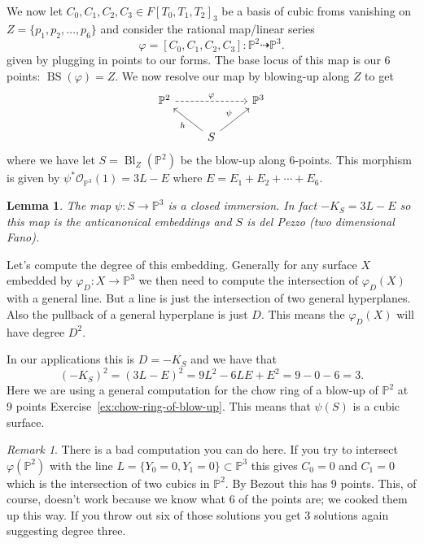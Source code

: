 \documentclass[12pt]{article}
\numberwithin{equation}{section}
\newtheorem{lemma}[theorem]{Lemma}
\theoremstyle{definition}
\theoremstyle{remark}
\newtheorem{remark}[theorem]{Remark}
\newcommand{\Ocal}{\mathcal{O}}
\newcommand{\PP}{\mathbb{P}}
\newcommand{\Bl}{\operatorname{Bl}}
\newcommand{\BS}{\operatorname{BS}}
\begin{document}
We now let $C_0,C_1,C_2,C_3 \in F[T_0,T_1,T_2]_3$ be a basis of cubic froms vanishing on $Z = \lbrace p_1,p_2,\ldots,p_6\rbrace$  and consider the rational map/linear series
$$ \varphi=[C_0,C_1,C_2,C_3]: \PP^2 \dashrightarrow \PP^3.$$
given by plugging in points to our  forms. 
The base locus of this map is our 6 points: $\BS(\varphi)=Z$.
We now resolve our map by blowing-up along $Z$ to get 
$$\begin{tikzcd}
\PP^2 \ar[rr,dashed,"\varphi"] & & \PP^3 \\
& S \ar[ur,"\psi"] \ar[ul,"h"] & 
\end{tikzcd}
$$
where we have let $S=\Bl_Z(\PP^2)$ be the blow-up along $6$-points.
This morphism is given by $\psi^*\Ocal_{\PP^3}(1) = 3L-E$ where $E=E_1+E_2+\cdots+E_6$.

\begin{lemma}
	The map $\psi:S \to \PP^3$ is a closed immersion. In fact $-K_S=3L-E$ so this map is the anticanonical embeddings and $S$ is del Pezzo (two dimensional Fano). 
\end{lemma}

Let's compute the degree of this embedding.
Generally for any surface $X$ embedded by $\varphi_D:X \to \PP^3$ we then need to compute the intersection of $\varphi_D(X)$ with a general line. 
But a line is just the intersection of two general hyperplanes. 
Also the pullback of a general hyperplane is just $D$. 
This means the $\varphi_D(X)$ will have degree $D^2$. 

In our applications this is $D=-K_S$ and we have that 
$$ (-K_S)^2 = (3L-E)^2 = 9L^2-6LE+E^2 = 9-0-6 = 3. $$
Here we are using a general computation for the chow ring of a blow-up of $\PP^2$ at 9 points Exercise~\ref{ex:chow-ring-of-blow-up}.
This means that $\psi(S)$ is a cubic surface. 

\begin{remark}
	There is a bad computation you can do here. 
	If you try to intersect $\varphi(\PP^2)$ with the line $L=\lbrace Y_0=0, Y_1=0 \rbrace \subset \PP^3$ this gives $C_0=0$ and $C_1=0$ which is the intersection of two cubics in $\PP^2$. 
	By Bezout this has 9 points. 
	This, of course, doesn't work because we know what 6 of the points are; we cooked them up this way. 
	If  you throw out six of those solutions you get 3 solutions again suggesting degree three.
\end{remark}
\end{document}
